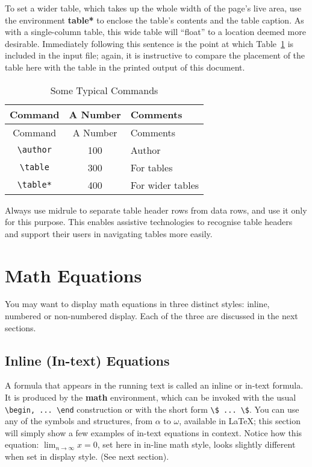 \documentclass[manuscript,screen,review]{acmart}
\begin{document}
To set a wider table, which takes up the whole width of the page's live
area, use the environment \textbf{table*} to enclose the table's
contents and the table caption. As with a single-column table, this wide
table will ``float'' to a location deemed more desirable. Immediately
following this sentence is the point at which Table~\ref{tbl-commands}
is included in the input file; again, it is instructive to compare the
placement of the table here with the table in the printed output of this
document.

\begin{longtable}[]{@{}ccl@{}}
\caption{Some Typical Commands}\label{tbl-commands}\tabularnewline
\toprule\noalign{}
Command & A Number & Comments \\
\midrule\noalign{}
\endfirsthead
\toprule\noalign{}
Command & A Number & Comments \\
\midrule\noalign{}
\endhead
\bottomrule\noalign{}
\endlastfoot
\texttt{\textbackslash{}author} & 100 & Author \\
\texttt{\textbackslash{}table} & 300 & For tables \\
\texttt{\textbackslash{}table*} & 400 & For wider tables \\
\end{longtable}

Always use midrule to separate table header rows from data rows, and use
it only for this purpose. This enables assistive technologies to
recognise table headers and support their users in navigating tables
more easily.

\section{Math Equations}\label{math-equations}

You may want to display math equations in three distinct styles: inline,
numbered or non-numbered display. Each of the three are discussed in the
next sections.

\subsection{Inline (In-text) Equations}\label{inline-in-text-equations}

A formula that appears in the running text is called an inline or
in-text formula. It is produced by the \textbf{math} environment, which
can be invoked with the usual
\texttt{\textbackslash{}begin,\ ...\ \textbackslash{}end} construction
or with the short form
\texttt{\textbackslash{}\$\ ...\ \textbackslash{}\$}. You can use any of
the symbols and structures, from \(\alpha\) to \(\omega\), available in
\LaTeX\citep{Lamport:LaTeX}; this section will simply show a few
examples of in-text equations in context. Notice how this equation:
\(\lim_{n\rightarrow \infty}x=0\), set here in in-line math style, looks
slightly different when set in display style. (See next section).
\end{document}
